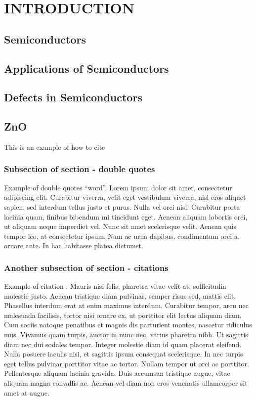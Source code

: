 \chapter{INTRODUCTION}
\section{Semiconductors}
\section{Applications of Semiconductors}
\section{Defects in Semiconductors}
\section{ZnO}
This is an example of how to cite \citep{Prades2009}
\subsection{Subsection of section - double quotes}
Example of double quotes ``word''. Lorem ipsum dolor sit amet, consectetur adipiscing elit. Curabitur viverra, velit eget vestibulum viverra, nisl eros aliquet sapien, sed interdum tellus justo et purus. Nulla vel orci nisl. Curabitur porta lacinia quam, finibus bibendum mi tincidunt eget. Aenean aliquam lobortis orci, ut aliquam neque imperdiet vel. Nunc sit amet scelerisque velit. Aenean quis tempor leo, at consectetur ipsum. Nam ac urna dapibus, condimentum orci a, ornare ante. In hac habitasse platea dictumst. 
\cite{Erhart2006}
\subsection{Another subsection of section - citations}
Example of citation \citep{altschul1997gapped}. Mauris nisi felis, pharetra vitae velit at, sollicitudin molestie justo. Aenean tristique diam pulvinar, semper risus sed, mattis elit. Phasellus interdum erat at enim maximus interdum. Curabitur tempor, arcu nec malesuada facilisis, tortor nisi ornare ex, ut porttitor elit lectus aliquam diam. Cum sociis natoque penatibus et magnis dis parturient montes, nascetur ridiculus mus. Vivamus quam turpis, auctor in nunc nec, varius pharetra nibh. Ut sagittis diam nec dui sodales tempor. Integer molestie diam id quam placerat eleifend. Nulla posuere iaculis nisi, et sagittis ipsum consequat scelerisque. In nec turpis eget tellus pulvinar porttitor vitae ac tortor. Nullam tempor ut orci ac porttitor. Pellentesque aliquam lacinia gravida. Duis accumsan tristique augue, vitae aliquam magna convallis ac. Aenean vel diam non eros venenatis ullamcorper sit amet at augue. 


